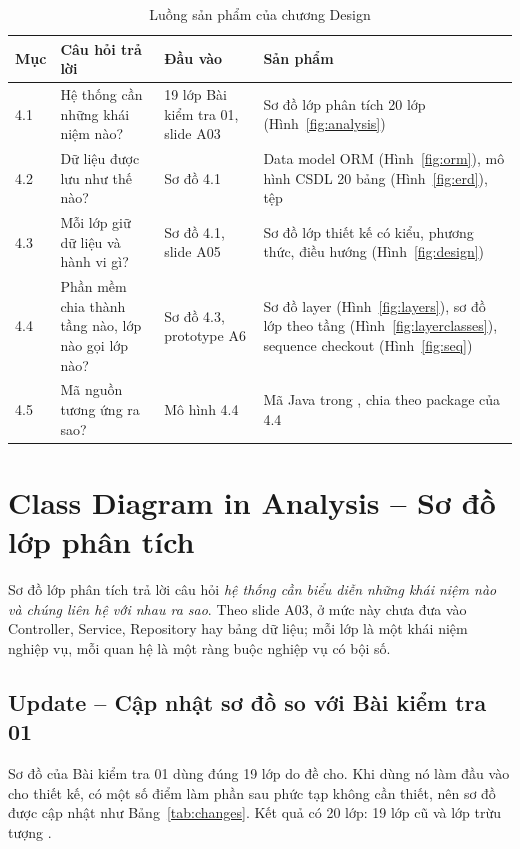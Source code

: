 \documentclass[12pt,a4paper]{article}
\begin{document}
\begin{table}[H]
\centering\small
\caption{Luồng sản phẩm của chương Design}\label{tab:flow}
\begin{tabular}{@{}P{1.0cm}P{3.6cm}P{4.4cm}P{6.2cm}@{}}
\toprule
Mục & Câu hỏi trả lời & Đầu vào & Sản phẩm\\
 & Hệ thống cần những khái niệm nào? & 19 lớp Bài kiểm tra 01, slide A03 & Sơ đồ lớp phân tích 20 lớp (Hình~\ref{fig:analysis})\\
4.2 & Dữ liệu được lưu như thế nào? & Sơ đồ 4.1 & Data model ORM (Hình~\ref{fig:orm}), mô hình CSDL 20 bảng (Hình~\ref{fig:erd}), tệp \\
4.3 & Mỗi lớp giữ dữ liệu và hành vi gì? & Sơ đồ 4.1, slide A05 & Sơ đồ lớp thiết kế có kiểu, phương thức, điều hướng (Hình~\ref{fig:design})\\
4.4 & Phần mềm chia thành tầng nào, lớp nào gọi lớp nào? & Sơ đồ 4.3, prototype A6 & Sơ đồ layer (Hình~\ref{fig:layers}), sơ đồ lớp theo tầng (Hình~\ref{fig:layerclasses}), sequence checkout (Hình~\ref{fig:seq})\\
4.5 & Mã nguồn tương ứng ra sao? & Mô hình 4.4 & Mã Java trong , chia theo package của 4.4\\
\bottomrule
\end{tabular}
\end{table}

\section{Class Diagram in Analysis -- Sơ đồ lớp phân tích}\label{sec:41}

Sơ đồ lớp phân tích trả lời câu hỏi \emph{hệ thống cần biểu diễn những khái niệm nào và chúng liên hệ
với nhau ra sao}. Theo slide A03, ở mức này chưa đưa vào Controller, Service, Repository hay bảng dữ
liệu; mỗi lớp là một khái niệm nghiệp vụ, mỗi quan hệ là một ràng buộc nghiệp vụ có bội số.

\subsection{Update -- Cập nhật sơ đồ so với Bài kiểm tra 01}

Sơ đồ của Bài kiểm tra 01 dùng đúng 19 lớp do đề cho. Khi dùng nó làm đầu vào cho thiết kế, có một số
điểm làm phần sau phức tạp không cần thiết, nên sơ đồ được cập nhật như Bảng~\ref{tab:changes}. Kết quả
có 20 lớp: 19 lớp cũ và lớp trừu tượng .
\end{document}
